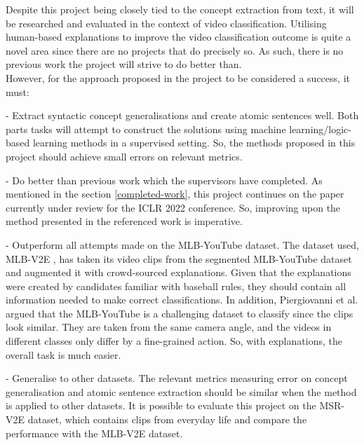 Despite this project being closely tied to the concept extraction from text, it will be researched and evaluated in the context of video classification.
Utilising human-based explanations to improve the video classification outcome is quite a novel area since there are no projects that do precisely so.
As such, there is no previous work the project will strive to do better than.\\

However, for the approach proposed in the project to be considered a success, it must:

 - Extract syntactic concept generalisations and create atomic sentences well. Both parts tasks will attempt to construct the solutions using machine learning/logic-based learning methods in a supervised setting. So, the methods proposed in this project should achieve small errors on relevant metrics.
 

 - Do better than previous work which the supervisors have completed. As mentioned in the section \ref{completed-work}, this project continues on the paper currently under review for the ICLR 2022 conference. So, improving upon the method presented in the referenced work is imperative.
 
 - Outperform all attempts made on the MLB-YouTube \cite{RefWorks:RefID:3-piergiovanni2018fine-grained} dataset. The dataset used, MLB-V2E \cite{RefWorks:RefID:16-2021automatic}, has taken its video clips from the segmented MLB-YouTube dataset and augmented it with crowd-sourced explanations. Given that the explanations were created by candidates familiar with baseball rules, they should contain all information needed to make correct classifications. 
 In addition, Piergiovanni et al. \cite{RefWorks:RefID:3-piergiovanni2018fine-grained} argued that the MLB-YouTube is a challenging dataset to classify since the clips look similar. They are taken from the same camera angle, and the videos in different classes only differ by a fine-grained action.
 So, with explanations, the overall task is much easier.
 
 - Generalise to other datasets. The relevant metrics measuring error on concept generalisation and atomic sentence extraction should be similar when the method is applied to other datasets. It is possible to evaluate this project on the MSR-V2E \cite{RefWorks:RefID:16-2021automatic} dataset, which contains clips from everyday life and compare the performance with the MLB-V2E \cite{RefWorks:RefID:16-2021automatic} dataset.
 
